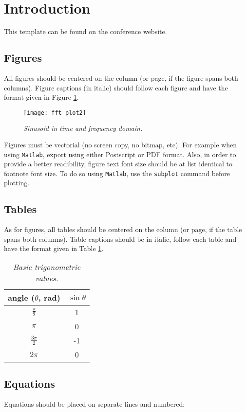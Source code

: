 \documentclass[twoside]{article}
\begin{document}
\section{Introduction}
This template can be found on the conference website.

\subsection{Figures} 
All figures should be centered on the column (or page, if the figure spans both columns). 
Figure captions (in italic) should follow each figure and have the format given in Figure \ref{fft_plot}.
\begin{figure}[ht]
\centerline{\texttt{[image: fft\_plot2]}}
\caption{{\it Sinusoid in time and frequency domain.}}  
\label{fft_plot}
\end{figure}
Figures must be vectorial (no screen copy, no bitmap, etc). For example when using \texttt{Matlab}, export using either Postscript or PDF format. Also, in order to provide a better readibility, figure text font size should be at list identical to footnote font size. To do so using \texttt{Matlab}, use the \texttt{subplot} command before plotting.

\subsection{Tables} 
As for figures, all tables should be centered on the column (or page, if the table spans both columns). 
Table captions should be in italic, follow each table and have the format given in Table \ref{tab:example}.

\begin{table}[htdp]
  \begin{center}
    \begin{tabular}{|c|c|}\hline
    	angle ($\theta$, rad) & $\sin \theta$ \\\hline
	$\frac{\pi}{2}$ & 1 \\
	$\pi$ & 0 \\
	$\frac{3\pi}{2}$ & -1 \\
	$2\pi$ & 0 \\\hline
    \end{tabular}
  \end{center}
  \label{tab:example}
  \caption{{\it Basic trigonometric values.}}
\end{table}%

\subsection{Equations}
Equations should be placed on separate lines and numbered:
\end{document}
